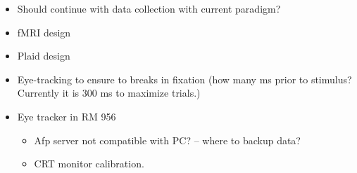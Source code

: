 \documentclass[11pt]{article} %
\begin{document}
\begin{itemize}
\begin{itemize}
	\item Should continue with data collection with current paradigm?
	\item fMRI design
	\item Plaid design
	\item Eye-tracking to ensure to breaks in fixation (how many ms prior to stimulus? Currently it is 300 ms to maximize trials.)
	\item Eye tracker in RM 956
		\begin{itemize}
			\item{Afp server not compatible with PC? -- where to backup data?}
			\item{CRT monitor calibration.}
		\end{itemize}
	\end{itemize}
\end{itemize}
\end{document}
